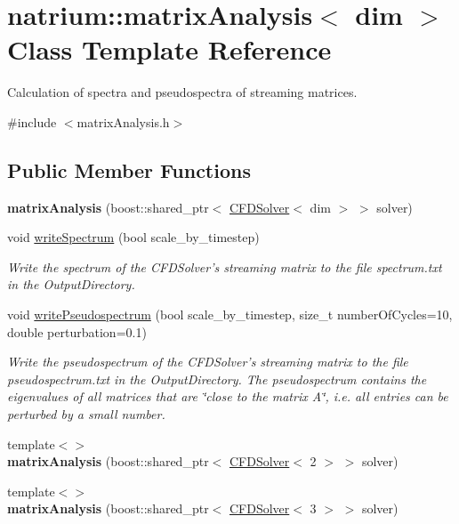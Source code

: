 \hypertarget{classnatrium_1_1matrixAnalysis}{
\section{natrium::matrixAnalysis$<$ dim $>$ Class Template Reference}
\label{classnatrium_1_1matrixAnalysis}
}


Calculation of spectra and pseudospectra of streaming matrices.  


{\ttfamily \#include $<$matrixAnalysis.h$>$}\subsection*{Public Member Functions}
\begin{DoxyCompactItemize}
\item 
\hypertarget{classnatrium_1_1matrixAnalysis_a2adce3a150d6a284ade9dfb4474f1c95}{
{\bfseries matrixAnalysis} (boost::shared\_\-ptr$<$ \hyperlink{classnatrium_1_1CFDSolver}{CFDSolver}$<$ dim $>$ $>$ solver)}
\label{classnatrium_1_1matrixAnalysis_a2adce3a150d6a284ade9dfb4474f1c95}

\item 
void \hyperlink{classnatrium_1_1matrixAnalysis_ae774e069b53034a25ed633f789af625e}{writeSpectrum} (bool scale\_\-by\_\-timestep)
\begin{DoxyCompactList}\small\item\em Write the spectrum of the CFDSolver's streaming matrix to the file spectrum.txt in the OutputDirectory. \item\end{DoxyCompactList}\item 
void \hyperlink{classnatrium_1_1matrixAnalysis_a9e9739f9d9181cc8b294bcbeca96df68}{writePseudospectrum} (bool scale\_\-by\_\-timestep, size\_\-t numberOfCycles=10, double perturbation=0.1)
\begin{DoxyCompactList}\small\item\em Write the pseudospectrum of the CFDSolver's streaming matrix to the file pseudospectrum.txt in the OutputDirectory. The pseudospectrum contains the eigenvalues of all matrices that are \char`\"{}close to the matrix A\char`\"{}, i.e. all entries can be perturbed by a small number. \item\end{DoxyCompactList}\item 
\hypertarget{classnatrium_1_1matrixAnalysis_a1ff55d84b26542fd69daecd377e97b73}{
{\footnotesize template$<$$>$ }\\{\bfseries matrixAnalysis} (boost::shared\_\-ptr$<$ \hyperlink{classnatrium_1_1CFDSolver}{CFDSolver}$<$ 2 $>$ $>$ solver)}
\label{classnatrium_1_1matrixAnalysis_a1ff55d84b26542fd69daecd377e97b73}

\item 
\hypertarget{classnatrium_1_1matrixAnalysis_abdfe6261017b6fc18bb6abe9c89d24d6}{
{\footnotesize template$<$$>$ }\\{\bfseries matrixAnalysis} (boost::shared\_\-ptr$<$ \hyperlink{classnatrium_1_1CFDSolver}{CFDSolver}$<$ 3 $>$ $>$ solver)}
\label{classnatrium_1_1matrixAnalysis_abdfe6261017b6fc18bb6abe9c89d24d6}

\end{DoxyCompactItemize}
